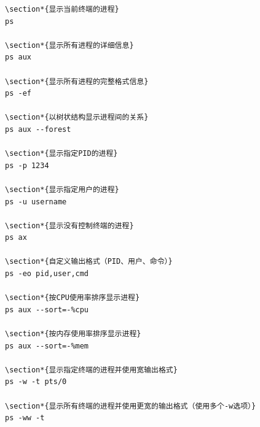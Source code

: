 \documentclass[12pt,UTF8]{ctexbook}
\begin{document}
\begin{verbatim}
\section*{显示当前终端的进程}
ps

\section*{显示所有进程的详细信息}
ps aux

\section*{显示所有进程的完整格式信息}
ps -ef

\section*{以树状结构显示进程间的关系}
ps aux --forest

\section*{显示指定PID的进程}
ps -p 1234

\section*{显示指定用户的进程}
ps -u username

\section*{显示没有控制终端的进程}
ps ax

\section*{自定义输出格式（PID、用户、命令）}
ps -eo pid,user,cmd

\section*{按CPU使用率排序显示进程}
ps aux --sort=-%cpu

\section*{按内存使用率排序显示进程}
ps aux --sort=-%mem

\section*{显示指定终端的进程并使用宽输出格式}
ps -w -t pts/0

\section*{显示所有终端的进程并使用更宽的输出格式（使用多个-w选项）}
ps -ww -t
\end{verbatim}
\end{document}
